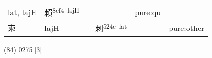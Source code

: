 \documentclass[14pt,a4paper]{scrartcl}
\begin{document}
\begin{longtable}[c]{@{}llllll@{}}
\begin{minipage}[t]{0.14\columnwidth}
lat, lajH
\strut\end{minipage} &
\begin{minipage}[t]{0.14\columnwidth}\raggedright\strut
賴\textsuperscript{8cf4~lajH}
\strut\end{minipage} &
\begin{minipage}[t]{0.14\columnwidth}\raggedright\strut
\strut\end{minipage} &
\begin{minipage}[t]{0.14\columnwidth}\raggedright\strut
\strut\end{minipage} &
\begin{minipage}[t]{0.14\columnwidth}\raggedright\strut
pure:qu
\strut\end{minipage}\tabularnewline
\begin{minipage}[t]{0.14\columnwidth}\raggedright\strut
柬
\strut\end{minipage} &
\begin{minipage}[t]{0.14\columnwidth}\raggedright\strut
lajH
\strut\end{minipage} &
\begin{minipage}[t]{0.14\columnwidth}\raggedright\strut
\strut\end{minipage} &
\begin{minipage}[t]{0.14\columnwidth}\raggedright\strut
剌\textsuperscript{524c~lat}
\strut\end{minipage} &
\begin{minipage}[t]{0.14\columnwidth}\raggedright\strut
\strut\end{minipage} &
\begin{minipage}[t]{0.14\columnwidth}\raggedright\strut
pure:other
\strut\end{minipage}\tabularnewline
\bottomrule
\end{longtable}

(84) 0275 {[}3{]}
\end{document}
